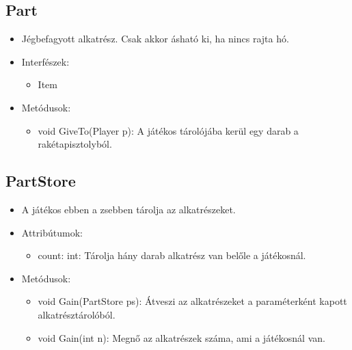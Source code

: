 \subsection{Part}
\begin{itemize}
		\item Jégbefagyott alkatrész. Csak akkor ásható ki, ha nincs rajta hó.
	\item Interfészek:
	\begin{itemize}
		\item Item
	\end{itemize}
	\item Metódusok:
	\begin{itemize}
		\item void GiveTo(Player p): A játékos tárolójába kerül egy darab a rakétapisztolyból.
	\end{itemize}
\end{itemize}

\subsection{PartStore}
\begin{itemize}
	\item A játékos ebben a zsebben tárolja az alkatrészeket.
	\item Attribútumok:
	\begin{itemize}
		\item count: int: Tárolja hány darab alkatrész van belőle a játékosnál.
	\end{itemize}
	\item Metódusok:
	\begin{itemize}
		\item void Gain(PartStore ps): Átveszi az alkatrészeket a paraméterként kapott alkatrésztárolóból.
		\item void Gain(int n): Megnő az alkatrészek száma, ami a játékosnál van.
	\end{itemize}
\end{itemize}

